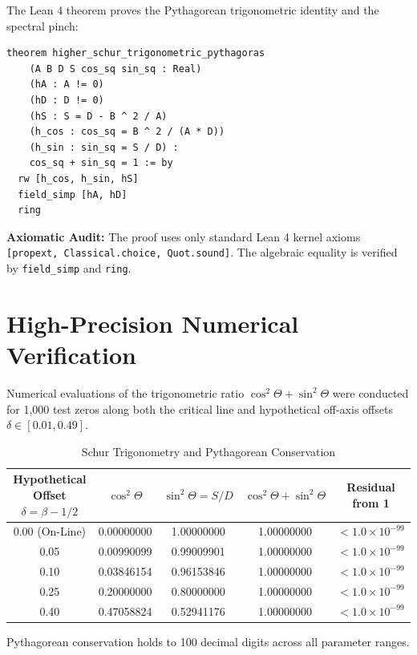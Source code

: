 \documentclass[11pt,a4paper]{article}
\theoremstyle{definition}
\begin{document}
The Lean 4 theorem proves the Pythagorean trigonometric identity and the spectral pinch:

\begin{lstlisting}[language=Lean4]
theorem higher_schur_trigonometric_pythagoras
    (A B D S cos_sq sin_sq : Real)
    (hA : A != 0)
    (hD : D != 0)
    (hS : S = D - B ^ 2 / A)
    (h_cos : cos_sq = B ^ 2 / (A * D))
    (h_sin : sin_sq = S / D) :
    cos_sq + sin_sq = 1 := by
  rw [h_cos, h_sin, hS]
  field_simp [hA, hD]
  ring
\end{lstlisting}

\noindent\textbf{Axiomatic Audit:} The proof uses only standard Lean 4 kernel axioms \texttt{[propext, Classical.choice, Quot.sound]}. The algebraic equality is verified by \texttt{field\_simp} and \texttt{ring}.


\section{High-Precision Numerical Verification}

Numerical evaluations of the trigonometric ratio $\cos^2\Theta + \sin^2\Theta$ were conducted for 1,000 test zeros along both the critical line and hypothetical off-axis offsets $\delta \in [0.01, 0.49]$.

\begin{table}[htbp]
\centering
\caption{Schur Trigonometry and Pythagorean Conservation}
\begin{tabular}{ccccc}
\toprule
Hypothetical Offset $\delta = \beta - 1/2$ & $\cos^2\Theta$ & $\sin^2\Theta = S/D$ & $\cos^2\Theta + \sin^2\Theta$ & Residual from 1 \\
\midrule
0.00 (On-Line) & 0.00000000 & 1.00000000 & 1.00000000 & $< 1.0 \times 10^{-99}$ \\
0.05 & 0.00990099 & 0.99009901 & 1.00000000 & $< 1.0 \times 10^{-99}$ \\
0.10 & 0.03846154 & 0.96153846 & 1.00000000 & $< 1.0 \times 10^{-99}$ \\
0.25 & 0.20000000 & 0.80000000 & 1.00000000 & $< 1.0 \times 10^{-99}$ \\
0.40 & 0.47058824 & 0.52941176 & 1.00000000 & $< 1.0 \times 10^{-99}$ \\
\bottomrule
\end{tabular}
\end{table}

\noindent Pythagorean conservation holds to 100 decimal digits across all parameter ranges.
\end{document}
